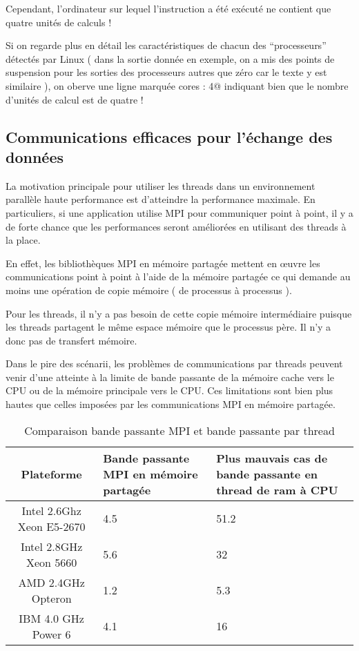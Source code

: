\documentclass[fleqn,11pt]{article}
\begin{document}
Cependant, l'ordinateur sur lequel l'instruction a été exécuté ne contient que quatre unités de calculs !

Si on regarde plus en détail les caractéristiques de chacun des ``processeurs'' détectés par Linux
( dans la sortie donnée en exemple, on a mis des points de suspension pour les sorties des processeurs
autres que zéro car le texte y est similaire ), on oberve une ligne marquée \verb@cpu cores     : 4@
indiquant bien que le nombre d'unités de calcul est de quatre !

\subsection{Communications efficaces pour l'échange des données}

La motivation principale pour utiliser les threads dans un environnement parallèle haute performance est d'atteindre
la performance maximale. En particuliers, si une application utilise MPI pour communiquer point à point, il y
a de forte chance que les performances seront améliorées en utilisant des threads à la place.

En effet, les bibliothèques MPI en mémoire partagée mettent en {\oe}uvre les communications point à point à l'aide de la
mémoire partagée ce qui demande au moins une opération de copie mémoire ( de processus à processus ).

Pour les threads, il n'y a pas besoin de cette copie mémoire intermédiaire puisque les threads partagent le même espace mémoire
que le processus père. Il n'y a donc pas de transfert mémoire.

Dans le pire des scénarii, les problèmes de communications par threads peuvent venir d'une atteinte à la limite
de bande passante de la mémoire cache vers le CPU ou de la mémoire principale vers le CPU. Ces limitations sont bien
plus hautes que celles imposées par les communications MPI en mémoire partagée.

\begin{table}[h]
 \begin{center}
  \begin{tabular}{|c|p{4cm}|p{4cm}|}\hline
   \rowcolor{lightgray!50} Plateforme & Bande passante MPI en mémoire partagée & Plus mauvais cas de bande passante en thread de ram à CPU \\ \hline
  Intel 2.6Ghz Xeon E5-2670 & 4.5 & 51.2 \\ \hline
  \rowcolor{lightgray!25}Intel 2.8GHz Xeon 5660 & 5.6 & 32 \\ \hline
  AMD   2.4GHz Opteron & 1.2 & 5.3 \\ \hline
 \rowcolor{lightgray!25}IBM 4.0 GHz Power 6 & 4.1 & 16 \\ \hline
  \end{tabular}
 \end{center}
  \caption{Comparaison bande passante MPI et bande passante par thread}
  \label{tab::compMPIpt}
\end{table}
\end{document}
